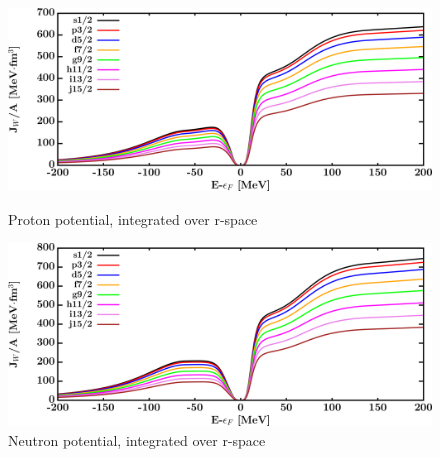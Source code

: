 \begin{figure}[H]
    \centering
    \begin{minipage}{0.45\textwidth}
        \centering
        \includegraphics[width=1.0\textwidth]{figures/ni58_protonVolumeIntegrals.png}
        \caption{Proton potential, integrated over r-space}
        \label{DOMFitData_ni58_proton_potentialIntegral}
    \end{minipage}\hfill
    \begin{minipage}{0.45\textwidth}
        \centering
        \includegraphics[width=1.0\textwidth]{figures/ni58_neutronVolumeIntegrals.png}
        \caption{Neutron potential, integrated over r-space}
        \label{DOMFitData_ni58_neutron_potentialIntegral}
    \end{minipage}
\end{figure}

\afterpage{\clearpage}

